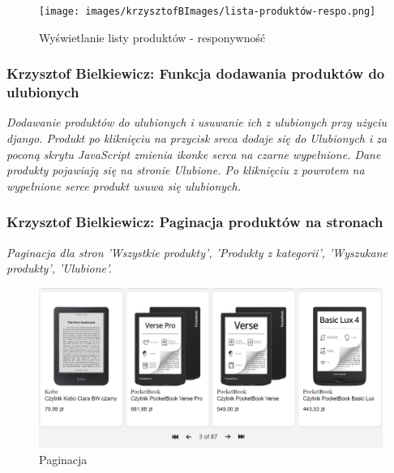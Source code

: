 \documentclass[12pt,a4paper,oneside]{article}
\theoremstyle{definition}
\numberwithin{equation}{section}
\begin{document}
\begin{figure}[H]
    \centering
    \texttt{[image: images/krzysztofBImages/lista-produktów-respo.png]}
    \caption{Wyświetlanie listy produktów - responywność}
\end{figure}



\subsubsection{Krzysztof Bielkiewicz: Funkcja dodawania produktów do ulubionych}
\label{1.3.14}
\textit{Dodawanie produktów do ulubionych i usuwanie ich z ulubionych przy użyciu django.
Produkt po kliknięciu na przycisk sreca dodaje się do Ulubionych i za poconą skrytu 
JavaScript zmienia ikonke serca na czarne wypełnione. Dane produkty pojawiają się na stronie Ulubione.
Po kliknięciu z powrotem na wypełnione serce produkt usuwa się ulubionych.}


\subsubsection{Krzysztof Bielkiewicz: Paginacja produktów na stronach}
\label{1.3.15}
\textit{Paginacja dla stron 'Wszystkie produkty', 'Produkty z kategorii', 'Wyszukane produkty', 'Ulubione'.}
\begin{figure}[H]
    \centering
    \includegraphics[width=1.0\columnwidth]{images/krzysztofBImages/pagination.png}
    \caption{Paginacja}
\end{figure}
\end{document}
